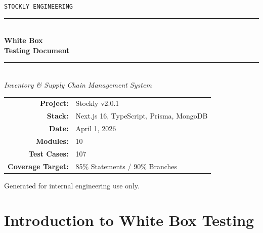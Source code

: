 \documentclass[12pt,a4paper]{report}
\begin{document}

\begin{titlepage}
  \pagecolor{primary}
  \color{white}
  \centering
  \vspace*{3cm}

  {\fontsize{14}{18}\selectfont\texttt{STOCKLY ENGINEERING}}\\[0.5cm]
  \rule{12cm}{1pt}\\[0.8cm]
  {\fontsize{36}{44}\selectfont\bfseries White Box\\[0.3cm]Testing Document}\\[0.8cm]
  \rule{12cm}{1pt}\\[1cm]

  {\Large\itshape Inventory \& Supply Chain Management System}\\[2cm]

  \begin{tabular}{rl}
    \textbf{Project:}   & Stockly v2.0.1 \\[4pt]
    \textbf{Stack:}     & Next.js 16, TypeScript, Prisma, MongoDB \\[4pt]
    \textbf{Date:}      & April 1, 2026 \\[4pt]
    \textbf{Modules:}   & 10 \\[4pt]
    \textbf{Test Cases:}& 107 \\[4pt]
    \textbf{Coverage Target:} & 85\% Statements / 90\% Branches \\
  \end{tabular}

  \vfill
  {\small\color{white!70} Generated for internal engineering use only.}
\end{titlepage}
\pagecolor{white}\color{black}

\tableofcontents
\newpage


\chapter{Introduction to White Box Testing}
\end{document}
